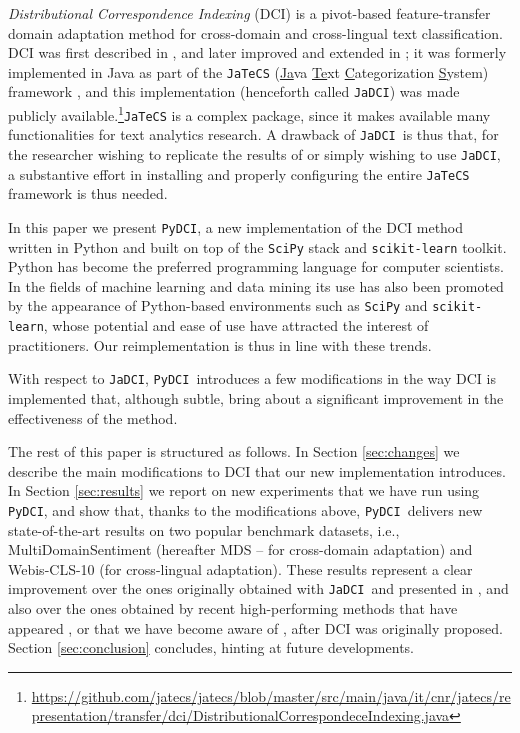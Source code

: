 \documentclass{article}
\newcommand{\jadci}{\texttt{JaDCI}}
\newcommand{\pydci}{\texttt{PyDCI}}
\begin{document}
\noindent \emph{Distributional Correspondence Indexing} (DCI) is a
pivot-based feature-transfer domain adaptation method for cross-domain
and cross-lingual text classification. DCI was first described in
\citep{dciecir2015}, and later improved and extended in
\citep{Moreo:2016fg}; it was formerly implemented in Java as part of
the \texttt{JaTeCS} (\underline{Ja}va \underline{Te}xt
\underline{C}ategorization \underline{S}ystem) framework
\citep{Esuli:2017wd}, and this implementation (henceforth called
\jadci) was made publicly
available.\footnote{\url{https://github.com/jatecs/jatecs/blob/master/src/main/java/it/cnr/jatecs/representation/transfer/dci/DistributionalCorrespondeceIndexing.java}}\texttt{JaTeCS}
is a complex package, since it makes available many functionalities
for text analytics research. A drawback of \jadci\ is thus that, for
the researcher wishing to replicate the results of
\citep{Moreo:2016fg} or simply wishing to use \jadci, a substantive
effort in installing and properly configuring the entire
\texttt{JaTeCS} framework is thus needed.

In this paper we present \pydci, a new implementation of the DCI
method written in Python and built on top of the \texttt{SciPy} stack
and \texttt{scikit-learn} toolkit. Python has become the preferred
programming language for computer scientists. In the fields of machine
learning and data mining its use has also been promoted by the
appearance of Python-based environments such as \texttt{SciPy} and
\texttt{scikit-learn}, whose potential and ease of use have attracted
the interest of practitioners. Our reimplementation is thus in line
with these trends.

With respect to \jadci, \pydci\ introduces a few modifications in the
way DCI is implemented that, although subtle, bring about a
significant improvement in the effectiveness of the method.

The rest of this paper is structured as follows. In Section
\ref{sec:changes} we describe the main modifications to DCI that our
new implementation introduces. In Section \ref{sec:results} we report
on new experiments that we have run using \pydci, and show that,
thanks to the modifications above, \pydci\ delivers new
state-of-the-art results on two popular benchmark datasets, i.e.,
MultiDomainSentiment (hereafter MDS -- for cross-domain adaptation)
and Webis-CLS-10 (for cross-lingual adaptation). These results
represent a clear improvement over the ones originally obtained with
\jadci\ and presented in \cite{Moreo:2016fg}, and also over the ones
obtained by recent high-performing methods that have appeared
\cite{ganin2016domain,Li:2017kg,xu2017cross,zhou2016cross}, or that we
have become aware of \cite{Yang:2015nb}, after DCI was originally
proposed. Section \ref{sec:conclusion} concludes, hinting at future
developments.
\end{document}

